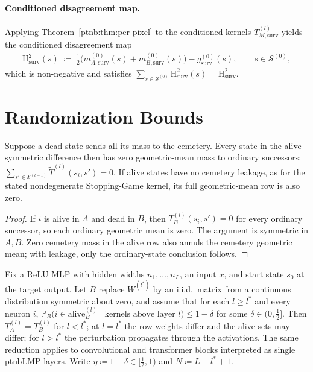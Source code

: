 \paragraph{Conditioned disagreement map.}
Applying Theorem~\ref{ptnb:thm:per-pixel} to the conditioned kernels $T_{M,\mathrm{surv}}^{(l)}$ yields
the conditioned disagreement map
\begin{align}\label{ptnb:eq:conditioned-per-pixel-h2}
    \mathrm{H}_{\mathrm{surv}}^2(s)
    \;\coloneqq\;
    \tfrac{1}{2}\bigl(m_{A,\mathrm{surv}}^{(0)}(s) + m_{B,\mathrm{surv}}^{(0)}(s)\bigr)
    -
    g_{\mathrm{surv}}^{(0)}(s),
    \qquad s \in \mathcal{S}^{(0)},
\end{align}
which is non-negative and satisfies $\sum_{s \in \mathcal{S}^{(0)}} \mathrm{H}_{\mathrm{surv}}^2(s)
    = \mathrm{H}_{\mathrm{surv}}^2$.

\section{Randomization Bounds}

\begin{lemmaenv}\label{ptnb:lem:alive-mismatch}
Suppose a dead state sends all its mass to the cemetery. Every state in the
alive symmetric difference then has zero geometric-mean mass to ordinary
successors:
$\sum_{s'\in\mathcal S^{(l-1)}}\widetilde T^{(l)}(s_i,s')=0$.
If alive states have no cemetery leakage, as for the stated nondegenerate
Stopping-Game kernel, its full geometric-mean row is also zero.\end{lemmaenv}

\begin{proof}
If $i$ is alive in $A$ and dead in $B$, then $T_B^{(l)}(s_i,s')=0$ for every
ordinary successor, so each ordinary geometric mean is zero. The argument is symmetric in $A,B$. Zero cemetery mass in the alive row also
annuls the cemetery geometric mean; with leakage, only the ordinary-state conclusion follows.
\end{proof}

Fix a ReLU MLP with hidden widths $n_1,\ldots,n_L$, an input $x$, and start state $s_0$ at the
target output.  Let $B$ replace $W^{(l^*)}$ by an i.i.d.\ matrix from a continuous distribution
symmetric about zero, and assume that for each $l \ge l^*$ and every neuron $i$,
$\mathbb{P}_B\bigl(i \in \mathrm{alive}^{(l)}_B \mid \text{kernels above layer } l\bigr) \le
    1-\delta$ for some $\delta \in (0,\tfrac12]$.  Then $T_A^{(l)} = T_B^{(l)}$ for $l < l^*$; at $l =
    l^*$ the row weights differ and the alive sets may differ; for $l > l^*$ the perturbation
propagates through the activations.  The same reduction applies to convolutional and transformer
blocks interpreted as single \ac{ptnbLMP} layers.  Write $\eta \coloneqq 1 - \delta \in
    \bigl[\tfrac{1}{2}, 1\bigr)$ and $N \coloneqq L - l^* + 1$.

